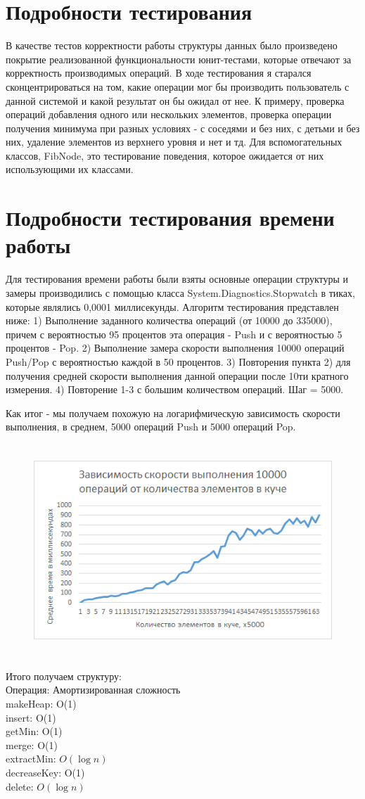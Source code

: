 \documentclass[article, a4paper]{llncs}
\begin{document}
    \section{Подробности тестирования}
    В качестве тестов корректности работы структуры данных было произведено покрытие реализованной функциональности юнит-тестами, которые отвечают за корректность производимых операций. В ходе тестирования я старался сконцентрироваться на том, какие операции мог бы производить пользователь с данной системой и какой результат он бы ожидал от нее. К примеру, проверка операций добавления одного или нескольких элементов, проверка операции получения минимума при разных условиях - с соседями и без них, с детьми и без них, удаление элементов из верхнего уровня и нет и тд. Для вспомогательных классов, FibNode, это тестирование поведения, которое ожидается от них использующими их классами. 
    \section{Подробности тестирования времени работы}
    Для тестирования времени работы были взяты основные операции структуры и замеры производились с помощью класса System.Diagnostics.Stopwatch в тиках, которые являлись 0,0001 миллисекунды. 
    Алгоритм тестирования представлен ниже:
    1) Выполнение заданного количества операций (от 10000 до 335000), причем с вероятностью 95 процентов эта операция - Push и с вероятностью 5 процентов - Pop.
    2) Выполнение замера скорости выполнения 10000 операций Push/Pop с вероятностью каждой в 50 процентов. 
    3) Повторения пункта 2) для получения средней скорости выполнения данной операции после 10ти кратного измерения.
    4) Повторение 1-3 с большим количеством операций. Шаг = 5000.
    
    Как итог - мы получаем похожую на логарифмическую зависимость скорости выполнения, в среднем, 5000 операций Push и 5000 операций Pop.
    \begin{figure}[h]
        \includegraphics[width=14cm, height=8cm]{1.png}
        \centering
    \end{figure}

   Итого получаем структуру:\\
    Операция: Амортизированная сложность \\
    makeHeap: O(1) \\
    insert: O(1) \\
    getMin: O(1) \\
    merge: O(1) \\
    extractMin: $O( \log n )$ \\
    decreaseKey: O(1) \\
    delete: $O( \log n )$ \\

   
\end{document}
